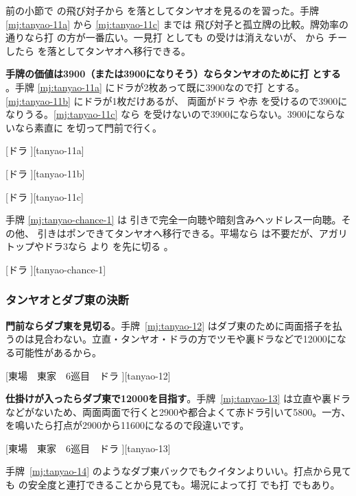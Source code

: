 \documentclass[../nankiru_main.tex]{subfiles}
\begin{document}
前の小節で  の飛び対子から  を落としてタンヤオを見るのを習った。手牌 \ref{mj:tanyao-11a} から \ref{mj:tanyao-11c} までは 飛び対子と孤立牌の比較。牌効率の通りなら打  の方が一番広い。一見打  としても  の受けは消えないが、 から  チーしたら  を落としてタンヤオへ移行できる。

\textbf{手牌の価値は3900（または3900になりそう）ならタンヤオのために打}  \textbf{とする} \citep[][pp.~165--170]{kawamura-naki}。手牌 \ref{mj:tanyao-11a} にドラが2枚あって既に3900なので打  とする。\ref{mj:tanyao-11b} にドラが1枚だけあるが、 両面がドラ  や赤  を受けるので3900になりうる。\ref{mj:tanyao-11c} なら  を受けないので3900にならない。3900にならないなら素直に  を切って門前で行く。

[ドラ ][tanyao-11a]

[ドラ ][tanyao-11b]

[ドラ ][tanyao-11c]

手牌 \ref{mj:tanyao-chance-1} は  引きで完全一向聴や暗刻含みヘッドレス一向聴。その他、 引きはポンできてタンヤオへ移行できる。平場なら  は不要だが、アガリトップやドラ3なら  より  を先に切る \citep[][pp.~17--18]{kawamura-naki}。

[ドラ ][tanyao-chance-1]


\subsubsection*{タンヤオとダブ東の決断}

\textbf{門前ならダブ東を見切る}\citep[][pp.~138--139]{fkt}。手牌~\ref{mj:tanyao-12} はダブ東のために両面搭子を払うのは見合わない。立直・タンヤオ・ドラの方でツモや裏ドラなどで12000になる可能性があるから。

[東場　東家　6巡目　ドラ ][tanyao-12]

\textbf{仕掛けが入ったらダブ東で12000を目指す}\citep[][pp.~140--141]{fkt}。手牌~\ref{mj:tanyao-13} は立直や裏ドラなどがないため、両面両面で行くと2900や都合よくて赤ドラ引いて5800。一方、 を鳴いたら打点が2900から11600になるので段違いです。

[東場　東家　6巡目　ドラ ][tanyao-13]

手牌~\ref{mj:tanyao-14} のようなダブ東バックでもクイタンよりいい。打点から見ても  の安全度と連打できることから見ても。場況によって打  でも打  でもあり\citep[][pp.~143--144, p.~218]{fkt}。
\end{document}
